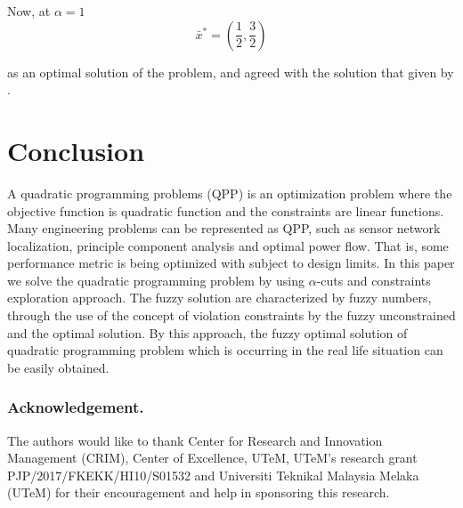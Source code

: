 \documentclass{iaesarticle3}
\begin{document}
Now, at $ \alpha = 1$
$$\bar{x}^* = (\frac{1}{2}, \frac{3}{2})$$

\noindent as an optimal solution of the problem, and agreed with the solution that given by \cite{dav}.

\section{Conclusion}
A quadratic programming problems (QPP) is an optimization problem where the objective function is quadratic function and the constraints are linear functions. Many engineering problems can be represented as QPP, such as sensor network localization, principle component analysis and optimal power flow. That is, some performance metric is being optimized with subject to design limits. In this paper we solve the quadratic programming problem by using $\alpha$-cuts and constraints exploration approach. The fuzzy solution are characterized by fuzzy numbers, through the use of the concept of violation constraints by the fuzzy unconstrained and the optimal solution. By this approach, the fuzzy optimal solution of quadratic programming problem which is occurring in the real life situation can be easily obtained.


\subsubsection*{Acknowledgement.}
The authors would like to thank Center for Research and Innovation Management (CRIM), Center of Excellence, UTeM, UTeM's research grant PJP/2017/FKEKK/HI10/S01532 and Universiti Teknikal Malaysia Melaka (UTeM) for their encouragement and help in sponsoring this research.
\end{document}
